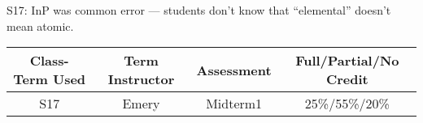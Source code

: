 \begin{outcomes}

S17: InP was common error --- students don't know that ``elemental'' doesn't mean atomic.

\begin{center}
	\begin{tabular}{cccc}
		\hline\hline
		Class-Term Used & Term Instructor & Assessment & Full/Partial/No Credit \\
		\hline
		S17 & Emery & Midterm1 & 25\%/55\%/20\%\\    %
		\hline
	\end{tabular}
\end{center}
\end{outcomes}

\begin{comments}


\end{comments}

